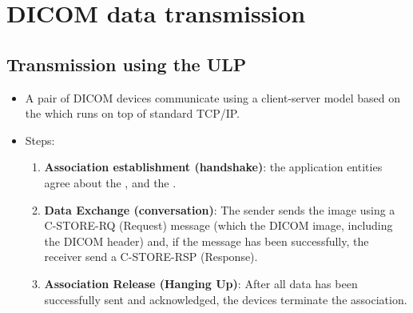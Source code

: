 \chapter{\gls{DICOM} data transmission}

\section{Transmission using the \gls{ULP}}
\begin{itemize}
\item A pair of \gls{DICOM} devices communicate using a client-server
  model based on the  which runs on top of standard TCP/IP.
\item Steps:
  \begin{enumerate}
  \item \textbf{Association establishment (handshake)}: the
    application entities agree about the , and the
    .
  \item \textbf{Data Exchange (conversation)}: The sender sends the
    image using a C-STORE-RQ (Request) message (which the DICOM image,
    including the DICOM header) and, if the message has been
    successfully, the receiver send a C-STORE-RSP (Response).
  \item \textbf{Association Release (Hanging Up)}: After all data has
    been successfully sent and acknowledged, the devices terminate the
    association.
  \end{enumerate}
\end{itemize}

